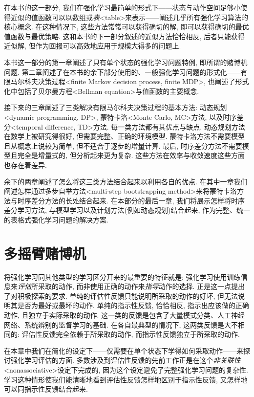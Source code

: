 在本书的这一部分, 我们在强化学习最简单的形式下——状态与动作空间足够小使得近似的值函数可以以数组或\emph{表}<table>来表示——阐述几乎所有强化学习算法的核心概念. 在这种情况下, 这些方法常常可以获得确切的解, 即可以获得确切的最优值函数与最优策略. 这和本书的下一部分叙述的近似方法恰恰相反, 后者只能获得近似解, 但作为回报可以高效地应用于规模大得多的问题上.

本书这一部分的第一章阐述了只有单个状态的强化学习问题特例, 即所谓的赌博机问题. 第二章阐述了在本书的余下部分使用的、一般强化学习问题的形式化——有限马尔科夫决策过程<finite Markov decision process, finite MDP>, 也阐述了形式化中包括了贝尔曼方程<Bellman equation>与值函数的主要概念.

接下来的三章阐述了三类解决有限马尔科夫决策过程的基本方法: 动态规划<dynamic programming, DP>, 蒙特卡洛<Monte Carlo, MC>方法, 以及时序差分<temporal difference, TD>方法. 每一类方法都有其优点与缺点. 动态规划方法在数学上被研究得很好, 但需要完整、正确的环境模型. 蒙特卡洛方法不需要模型且从概念上说较为简单, 但不适合于逐步的增量计算. 最后, 时序差分方法不需要模型且完全是增量式的, 但分析起来更为复杂. 这些方法在效率与收敛速度这些方面也存在着差异.

余下的两章阐述了怎么将这三类方法结合起来以利用各自的优点. 在其中一章我们阐述怎样通过多步自举方法<multi-step bootstrapping method>来将蒙特卡洛方法与时序差分方法的长处结合起来. 在本部分的最后一章, 我们将展示怎样将时序差分学习方法, 与模型学习以及计划方法(例如动态规划)结合起来, 作为完整、统一的表格式强化学习问题的解决方案.

\chapter{多摇臂赌博机}\label{chap:2}

将强化学习同其他类型的学习区分开来的最重要的特征就是: 强化学习使用训练信息来\emph{评估}所采取的动作, 而非使用正确的动作来\emph{指导}动作的选择. 正是这一点提出了对积极探索的要求. 单纯的评估性反馈只能说明所采取的动作的好坏, 但无法说明其是否为最好或最坏的动作. 单纯的指示性反馈, 恰恰相反, 指示出应该做的正确动作, 且独立于实际采取的动作. 这一类的反馈是包含了大量模式分类、人工神经网络、系统辨别的监督学习的基础. 在各自最典型的情况下, 这两类反馈是大不相同的: 评估性反馈完全依赖于所采取的动作, 而指示性反馈独立于所采取的动作.

在本章中我们在简化的设定下——仅需要在单个状态下学得如何采取动作——来探讨强化学习评估的方面. 多数涉及到评估性反馈的先前工作正是在这个\emph{非关联性}<nonassociative>设定下完成的, 因为这个设定避免了完整强化学习问题的复杂性. 学习这种情形使我们能清晰地看到评估性反馈怎样地区别于指示性反馈, 又怎样地可以同指示性反馈结合起来.

